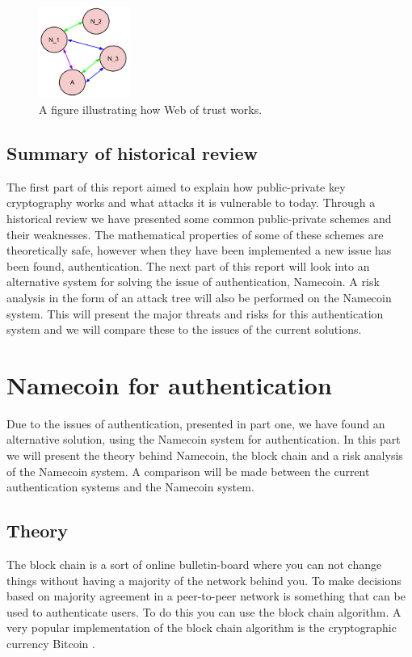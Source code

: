\documentclass[frame, english]{idamasterthesis}
\begin{document}
\begin{figure}[h!]      %
    \centering
    \includegraphics[width = 30mm]{Pics/weboftrust.png}
    \caption{A figure illustrating how Web of trust works.}
    \label{fig:weboftrust}
\end{figure}

\section{Summary of historical review}
The first part of this report aimed to explain how public-private key cryptography works and what attacks it is vulnerable to today. Through a historical review we have presented some common public-private schemes and their weaknesses. The mathematical properties of some of these schemes are theoretically safe, however when they have been implemented a new issue has been found, authentication. The next part of this report will look into an alternative system for solving the issue of authentication, Namecoin. A risk analysis in the form of an attack tree will also be performed on the Namecoin system. This will present the major threats and risks for this authentication system and we will compare these to the issues of the current solutions.

\chapter{Namecoin for authentication} \chaptermark{}
Due to the issues of authentication, presented in part one, we have found an alternative solution, using the Namecoin system for authentication. In this part we will present the theory behind Namecoin, the block chain and a risk analysis of the Namecoin system. A comparison will be made between the current authentication systems and the Namecoin system.

\section{Theory}
The block chain is a sort of online bulletin-board where you can not change things without having a majority of the network behind you. To make decisions based on majority agreement in a peer-to-peer network is something that can be used to authenticate users. To do this you can use the block chain algorithm. A very popular implementation of the block chain algorithm is the cryptographic currency Bitcoin \cite{bitcoin}.
\end{document}
